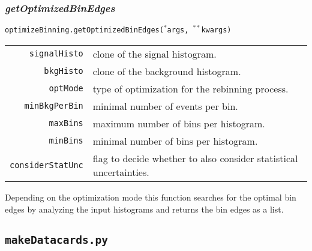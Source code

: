 \documentclass[12pt, a4paper]{article}
\newcommand{\args}{$^*$args}
\newcommand{\kwargs}{$^{**}$kwargs}
\begin{document}
\subsubsection{\textit{getOptimizedBinEdges}}
\texttt{optimizeBinning.getOptimizedBinEdges(\args, \kwargs)}\\
\begin{tabular}{r|l}
\hline
\texttt{signalHisto}	&	clone of the signal histogram.\\
\texttt{bkgHisto}		&	clone of the background histogram.\\
\texttt{optMode}		&	type of optimization for the rebinning process.\\
\texttt{minBkgPerBin}	&	minimal number of events per bin.\\
\texttt{maxBins}		&	maximum number of bins per histogram.\\
\texttt{minBins}		&	minimal number of bins per histogram.\\
\texttt{considerStatUnc}&	flag to decide whether to also consider statistical uncertainties.\\
\hline
\end{tabular}
Depending on the optimization mode this function searches for the optimal bin edges by analyzing the input histograms and returns the bin edges as a list.







\subsection{\texttt{makeDatacards.py}}
\end{document}
